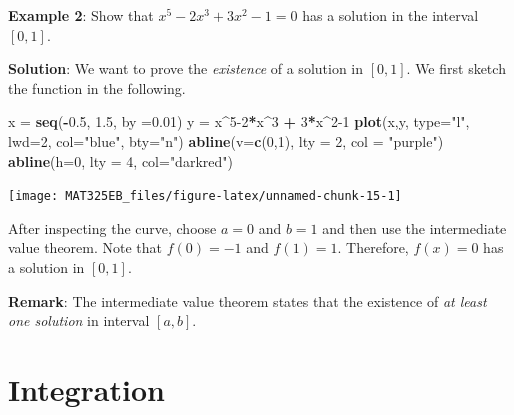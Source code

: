 \documentclass[
]{book}
\newenvironment{Shaded}{\begin{snugshade}}{\end{snugshade}}
\newcommand{\AttributeTok}[1]{\textcolor[rgb]{0.13,0.29,0.53}{#1}}
\newcommand{\DecValTok}[1]{\textcolor[rgb]{0.00,0.00,0.81}{#1}}
\newcommand{\FloatTok}[1]{\textcolor[rgb]{0.00,0.00,0.81}{#1}}
\newcommand{\FunctionTok}[1]{\textcolor[rgb]{0.13,0.29,0.53}{\textbf{#1}}}
\newcommand{\NormalTok}[1]{#1}
\newcommand{\OtherTok}[1]{\textcolor[rgb]{0.56,0.35,0.01}{#1}}
\newcommand{\SpecialCharTok}[1]{\textcolor[rgb]{0.81,0.36,0.00}{\textbf{#1}}}
\newcommand{\StringTok}[1]{\textcolor[rgb]{0.31,0.60,0.02}{#1}}
\begin{document}
\hfill\break

\textbf{Example 2}: Show that \(x^5 - 2x^3 + 3x^2 - 1 = 0\) has a solution in the interval \([0, 1]\).

\textbf{Solution}: We want to prove the \emph{existence} of a solution in \([0, 1]\). We first sketch the function in the following.

\begin{Shaded}
\begin{Highlighting}[]
\NormalTok{x }\OtherTok{=} \FunctionTok{seq}\NormalTok{(}\SpecialCharTok{{-}}\FloatTok{0.5}\NormalTok{, }\FloatTok{1.5}\NormalTok{, }\AttributeTok{by =}\FloatTok{0.01}\NormalTok{)}
\NormalTok{y }\OtherTok{=}\NormalTok{ x}\SpecialCharTok{\^{}}\DecValTok{5{-}2}\SpecialCharTok{*}\NormalTok{x}\SpecialCharTok{\^{}}\DecValTok{3} \SpecialCharTok{+} \DecValTok{3}\SpecialCharTok{*}\NormalTok{x}\SpecialCharTok{\^{}}\DecValTok{2{-}1}
\FunctionTok{plot}\NormalTok{(x,y, }\AttributeTok{type=}\StringTok{"l"}\NormalTok{, }\AttributeTok{lwd=}\DecValTok{2}\NormalTok{, }\AttributeTok{col=}\StringTok{"blue"}\NormalTok{, }\AttributeTok{bty=}\StringTok{"n"}\NormalTok{)}
\FunctionTok{abline}\NormalTok{(}\AttributeTok{v=}\FunctionTok{c}\NormalTok{(}\DecValTok{0}\NormalTok{,}\DecValTok{1}\NormalTok{), }\AttributeTok{lty =} \DecValTok{2}\NormalTok{, }\AttributeTok{col =} \StringTok{"purple"}\NormalTok{)}
\FunctionTok{abline}\NormalTok{(}\AttributeTok{h=}\DecValTok{0}\NormalTok{, }\AttributeTok{lty =} \DecValTok{4}\NormalTok{, }\AttributeTok{col=}\StringTok{"darkred"}\NormalTok{)}
\end{Highlighting}
\end{Shaded}

\begin{center}\texttt{[image: MAT325EB\_files/figure-latex/unnamed-chunk-15-1]} \end{center}

After inspecting the curve, choose \(a = 0\) and \(b = 1\) and then use the intermediate value theorem. Note that \(f(0) = -1\) and \(f(1) = 1\). Therefore, \(f(x) = 0\) has a solution in \([0,1]\).

\textbf{Remark}: The intermediate value theorem states that the existence of \emph{at least one solution} in interval \([a, b]\).

\hypertarget{integration}{%
\section{Integration}\label{integration}}
\end{document}
